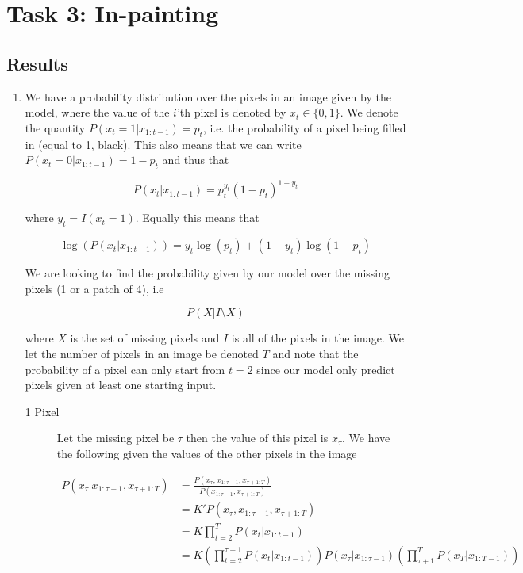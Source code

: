 \documentclass{article}
\begin{document}
\section{Task 3: In-painting}

\subsection{Results}

\begin{enumerate}
\item

  We have a probability distribution over the pixels in an image given by the model, where the
  value of the $i$'th pixel is denoted by $x_t \in \{0, 1\}$. We denote the
  quantity $P(x_t = 1 | x_{1:t-1}) = p_t$, i.e. the probability of a pixel being
  filled in (equal to 1, black). This also means that we can write $P(x_t = 0 |
  x_{1:t-1}) = 1 - p_t$ and thus that

  \begin{equation*}
    P(x_t | x_{1:t-1}) = p_t^{y_t}(1 - p_t)^{1 - y_t}
  \end{equation*}

  where $y_t = I(x_t = 1)$. Equally this means that

  \begin{equation*}
    \log(P(x_t | x_{1:t-1})) = y_t\log(p_t) + (1 - y_t)\log(1 - p_t)
  \end{equation*}
  
  We are looking to find the probability given by our model over the missing
  pixels (1 or a patch of 4), i.e 

  \begin{equation*}
    P(X | I \setminus X)
  \end{equation*}

  where $X$ is the set of missing pixels and $I$ is all of the pixels in the
  image. We let the number of pixels in an image be denoted $T$ and note that
  the probability of a pixel can only start from $t = 2$ since our model only
  predict pixels given at least one starting input.
  
  \begin{description}
  \item[1 Pixel] Let the missing pixel be $\tau$ then the value of this pixel is
    $x_{\tau}$. We have the following given the values of the other pixels in
    the image

    \begin{align*}
      P(x_{\tau} | x_{1:\tau - 1}, x_{\tau + 1:T}) & = \frac{P(x_{\tau}, x_{1:\tau - 1}, x_{\tau + 1:T})}{P(x_{1:\tau - 1}, x_{\tau + 1:T})} \\
                                                   & = K'P(x_{\tau}, x_{1:\tau - 1}, x_{\tau + 1:T}) \\
                                                   & = K\prod_{t = 2}^TP(x_t|x_{1:t-1}) \\
                                                   & = K(\prod_{t = 2}^{\tau - 1}P(x_t|x_{1:t-1}))P(x_{\tau}|x_{1:\tau-1})(\prod_{\tau + 1}^TP(x_T|x_{1:T-1}))
    \end{align*}


\end{description}
\end{enumerate}
\end{document}
